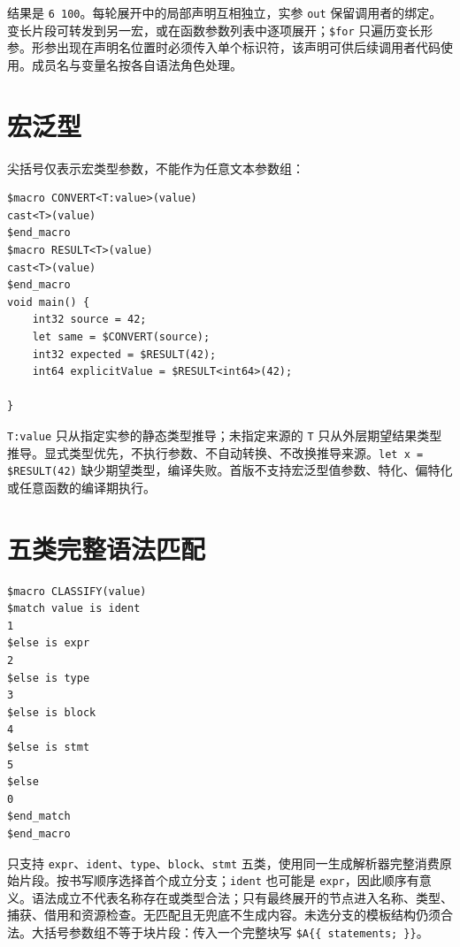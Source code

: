 结果是 \texttt{6 100}。每轮展开中的局部声明互相独立，实参 \texttt{out} 保留调用者的绑定。变长片段可转发到另一宏，或在函数参数列表中逐项展开；\texttt{\$for} 只遍历变长形参。形参出现在声明名位置时必须传入单个标识符，该声明可供后续调用者代码使用。成员名与变量名按各自语法角色处理。

\section{宏泛型}

尖括号仅表示宏类型参数，不能作为任意文本参数组：

\par
\medskip
\begin{lstlisting}[style=chali]
$macro CONVERT<T:value>(value)
cast<T>(value)
$end_macro
$macro RESULT<T>(value)
cast<T>(value)
$end_macro
void main() {
    int32 source = 42;
    let same = $CONVERT(source);
    int32 expected = $RESULT(42);
    int64 explicitValue = $RESULT<int64>(42);

}
\end{lstlisting}
\par
\medskip

\texttt{T:\allowbreak{}value} 只从指定实参的静态类型推导；未指定来源的 \texttt{T} 只从外层期望结果类型推导。显式类型优先，不执行参数、不自动转换、不改换推导来源。\texttt{let x =\allowbreak{} \$RESULT(\allowbreak{}42)\allowbreak{}} 缺少期望类型，编译失败。首版不支持宏泛型值参数、特化、偏特化或任意函数的编译期执行。

\section{五类完整语法匹配}

\par
\medskip
\begin{lstlisting}[style=chali]
$macro CLASSIFY(value)
$match value is ident
1
$else is expr
2
$else is type
3
$else is block
4
$else is stmt
5
$else
0
$end_match
$end_macro
\end{lstlisting}
\par
\medskip

只支持 \texttt{expr}、\texttt{ident}、\texttt{type}、\texttt{block}、\texttt{stmt} 五类，使用同一生成解析器完整消费原始片段。按书写顺序选择首个成立分支；\texttt{ident} 也可能是 \texttt{expr}，因此顺序有意义。语法成立不代表名称存在或类型合法；只有最终展开的节点进入名称、类型、捕获、借用和资源检查。无匹配且无兜底不生成内容。未选分支的模板结构仍须合法。大括号参数组不等于块片段：传入一个完整块写 \texttt{\$A\{\{ statements; \}\}}。

